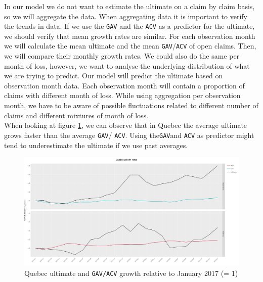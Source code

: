 	In our model we do not want to estimate the ultimate on a claim by claim basis, so we will aggregate the data. When aggregating data it is important to verify the trends in data. If we use the \texttt{GAV} and the \texttt{ACV} as a predictor for the ultimate, we should verify that mean growth rates are similar. For each observation month we will calculate the mean ultimate and the mean \texttt{GAV}/\texttt{ACV} of open claims. Then, we will compare their monthly growth rates.  We could also do the same per month of loss, however, we want to analyse the underlying distribution of what we are trying to predict. Our model will predict the ultimate based on observation month data. Each observation month will contain a proportion of claims with different month of loss. While using aggregation per observation month, we have to be aware of possible fluctuations related to different number of claims and different mixtures of month of loss.\\
	When looking at figure \ref{Fig_QC_growth}, we can observe that in Quebec the average ultimate grows faster than the average \texttt{GAV}/ \texttt{ACV}. Using the\texttt{GAV}and \texttt{ACV} as predictor might tend to underestimate the ultimate if we use past averages. 
	
	\begin{figure}[H]
		\begin{center}
			\includegraphics[scale=0.2]{Graphiques/QC_growth} 
			\renewcommand{\figurename}{Figure}
			\caption{Quebec ultimate and \texttt{GAV/ACV} growth relative to January 2017 (= 1)}\label{Fig_QC_growth}
		\end{center}
	\end{figure}

